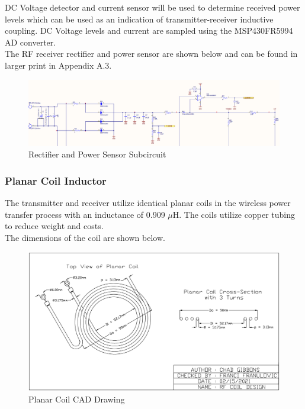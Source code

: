 \documentclass[12pt]{article}
\begin{document}
\indent
DC Voltage detector and current sensor will be used to determine received power levels which can be used as an indication of transmitter-receiver inductive coupling. DC Voltage levels and current are sampled using the MSP430FR5994 AD converter.\\

\indent
The RF receiver rectifier and power sensor are shown below and can be found in larger print in Appendix A.3.%

\hfill

\begin{figure}[h!]
\centering
\includegraphics[width=0.88\linewidth]{rx_dc_rf_conv}
\caption{Rectifier and Power Sensor Subcircuit}
\end{figure}

\hfill

\pagebreak

\subsubsection{Planar Coil Inductor} The transmitter and receiver utilize identical planar coils in the wireless power transfer process with an inductance of 0.909 $\mu$H. The coils utilize copper tubing to reduce weight and costs. \\

\indent
The dimensions of the coil are shown below.
\hfill

\begin{figure}[h!]
\centering
\includegraphics[width=0.95\linewidth]{Coil_CAD}
\caption{Planar Coil CAD Drawing}
\end{figure}
\end{document}

